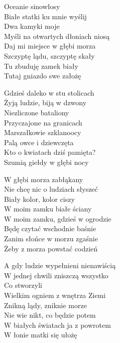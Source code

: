 \begin{text}
    Oceanie sinowłosy\\
    Białe statki ku mnie wyślij\\
    Dwa kamyki moje\\
    Myśli na otwartych dłoniach niosą\\
    Daj mi miejsce w głębi morza\\
    Szczyptę lądu, szczyptę skały\\
    Tu zbuduję zamek biały\\
    Tutaj gniazdo swe założę

    Gdzieś daleko w stu stolicach\\
    Żyją ludzie, biją w dzwony\\
    Niezliczone bataliony\\
    Przyczajone na granicach\\
    Marszałkowie szklanoocy\\
    Palą owce i dziewczęta\\
    Kto o kwiatach dziś pamięta?\\
    Szumią giełdy w głębi nocy

    W głębi morza zabłąkany\\
    Nie chcę nic o ludziach słyszeć\\
    Biały kolor, kolor ciszy\\
    W moim zamku białe ściany\\
    W moim zamku, gdzieś w ogrodzie\\
    Będę czytać wschodnie baśnie\\
    Zanim słońce w morzu zgaśnie\\
    Żeby z morza powstać codzień

    A gdy ludzie wypełnieni nienawiścią\\
    W jednej chwili zniszczą wszystko\\
    Co stworzyli\\
    Wielkim ogniem z wnętrza Ziemi\\
    Znikną lądy, zniknie morze\\
    Nie wie nikt, co będzie potem\\
    W białych światach ja z powrotem\\
    W łonie matki się ułożę
\end{text}
